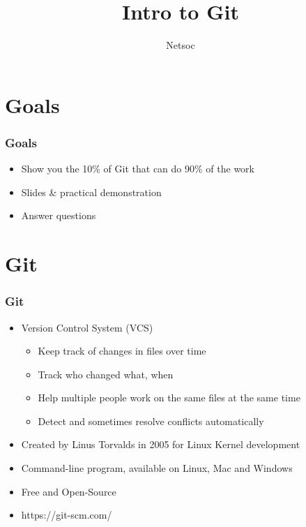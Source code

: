 \documentclass{beamer}
\title{Intro to Git}
\author{Netsoc}
\date{}
\begin{document}
\frame{\titlepage}

\section{Goals}
\begin{frame}
\frametitle{Goals}
\begin{itemize}
\item Show you the 10\% of Git that can do 90\% of the work
\item Slides \& practical demonstration
\item Answer questions
\end{itemize}
\end{frame}

\section{Git}
\begin{frame}
\frametitle{Git}
\begin{itemize}
\item Version Control System (VCS)
\begin{itemize}
\item Keep track of changes in files over time
\item Track who changed what, when
\item Help multiple people work on the same files at the same time
\item Detect and sometimes resolve conflicts automatically
\end{itemize}
\item Created by Linus Torvalds in 2005 for Linux Kernel development
\item Command-line program, available on Linux, Mac and Windows
\item Free and Open-Source
\item https://git-scm.com/
\end{itemize}
\end{frame}
\end{document}

